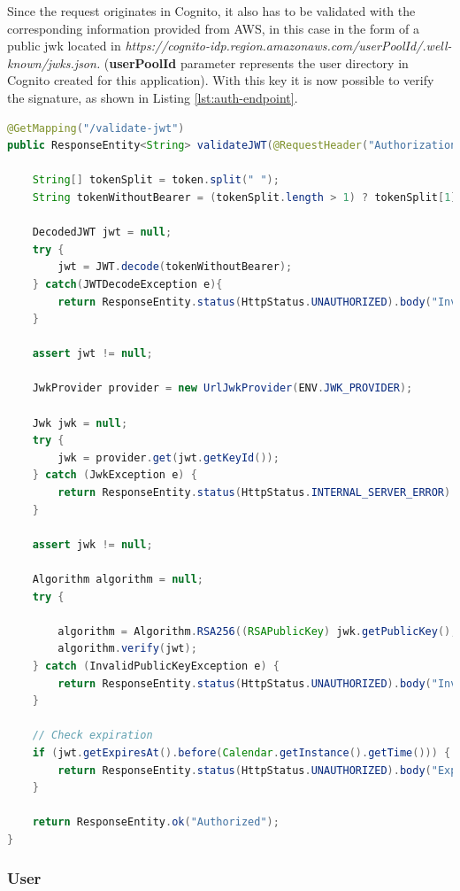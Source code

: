 Since the request originates in Cognito, it also has to be validated with the corresponding information provided from AWS, in this case in the form of a public \acrfull{jwk} located in \textit{https://cognito-idp.{region}.amazonaws.com/{userPoolId}/.well-known/jwks.json.} (\textbf{userPoolId} parameter represents the user directory in Cognito created for this application). With this key it is now possible to verify the signature, as shown in Listing \ref{lst:auth-endpoint}.

\begin{lstlisting}[float, language={Java}, caption={Authentication endpoint}, label={lst:auth-endpoint}, captionpos=t]
@GetMapping("/validate-jwt")
public ResponseEntity<String> validateJWT(@RequestHeader("Authorization") String token) {
    
    String[] tokenSplit = token.split(" ");
    String tokenWithoutBearer = (tokenSplit.length > 1) ? tokenSplit[1] : token;

    DecodedJWT jwt = null;
    try {
        jwt = JWT.decode(tokenWithoutBearer);
    } catch(JWTDecodeException e){
        return ResponseEntity.status(HttpStatus.UNAUTHORIZED).body("Invalid JSON format");
    }

    assert jwt != null;

    JwkProvider provider = new UrlJwkProvider(ENV.JWK_PROVIDER);

    Jwk jwk = null;
    try {
        jwk = provider.get(jwt.getKeyId());
    } catch (JwkException e) {
        return ResponseEntity.status(HttpStatus.INTERNAL_SERVER_ERROR).body("JKW Provider is down");
    }

    assert jwk != null;

    Algorithm algorithm = null;
    try {

        algorithm = Algorithm.RSA256((RSAPublicKey) jwk.getPublicKey(), null);
        algorithm.verify(jwt);
    } catch (InvalidPublicKeyException e) {
        return ResponseEntity.status(HttpStatus.UNAUTHORIZED).body("Invalid token");
    }

    // Check expiration
    if (jwt.getExpiresAt().before(Calendar.getInstance().getTime())) {
        return ResponseEntity.status(HttpStatus.UNAUTHORIZED).body("Expired");
    }

    return ResponseEntity.ok("Authorized");
}
\end{lstlisting}


\subsubsection{User} 
\label{sss:user}

